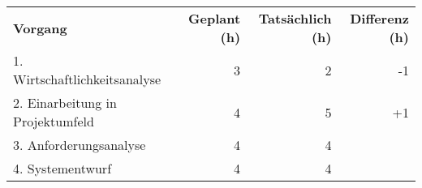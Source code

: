 \begin{tabularx}{\textwidth}{Xrrr}
    \rowcolor{KVGruen}\textbf{Vorgang} & \textbf{Geplant (h)} & \textbf{Tatsächlich (h)} & \textbf{Differenz (h)} \\
    1. Wirtschaftlichkeitsanalyse & 3 & 2 & -1 \\
    \rowcolor{KVGrau}2. Einarbeitung in Projektumfeld & 4   & 5   & +1 \\
    3. Anforderungsanalyse & 4 & 4 & \\
    \rowcolor{KVGrau}4. Systementwurf & 4   & 4   &  \\
\end{tabularx}
    
